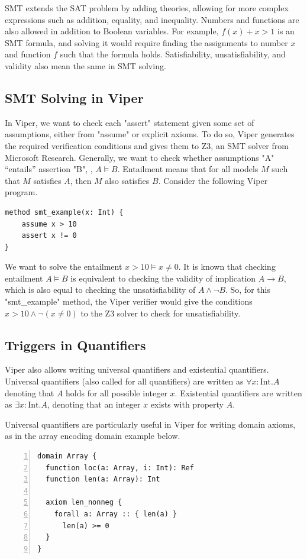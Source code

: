 \documentclass[msc,oneside]{ubcthesis}
\begin{document}
SMT extends the SAT problem by adding theories, allowing for more complex expressions such as addition, equality, and inequality. Numbers and functions are also allowed in addition to Boolean variables. For example, $f(x) + x > 1$ is an SMT formula, and solving it would require finding the assignments to number $x$ and function $f$ such that the formula holds. Satisfiability, unsatisfiability, and validity also mean the same in SMT solving.

\subsection{SMT Solving in Viper}
In Viper, we want to check each "assert" statement given some set of assumptions, either from "assume" or explicit axioms. To do so, Viper generates the required verification conditions and gives them to Z3, an SMT solver from Microsoft Research. Generally, we want to check whether assumptions "A" ``entails'' assertion "B", \ie, $A \models B$. Entailment means that for all models $M$ such that $M$ satisfies $A$, then $M$ also satisfies $B$. Consider the following Viper program.
\begin{lstlisting}
method smt_example(x: Int) {
    assume x > 10
    assert x != 0
}
\end{lstlisting}
We want to solve the entailment $x > 10 \models x \neq 0$. It is known that checking entailment $A \models B$ is equivalent to checking the validity of implication $A \rightarrow B$, which is also equal to checking the unsatisfiability of  $A \land \neg B$. So, for this "smt_example" method, the Viper verifier would give the conditions $x > 10\land \neg( x \neq 0)$ to the Z3 solver to check for unsatisfiability. 

\subsection{Triggers in Quantifiers}
Viper also allows writing universal quantifiers and existential quantifiers. Universal quantifiers (also called for all quantifiers) are written as $\forall x: \text{Int}. A$ denoting that $A$ holds for all possible integer $x$. Existential quantifiers are written as $\exists x: \text{Int}. A$, denoting that an integer $x$ exists with property $A$.

Universal quantifiers are particularly useful in Viper for writing domain axioms, as in the array encoding domain example below.
\begin{lstlisting}[language=silver,numbers=left, firstnumber=1, stepnumber=1]
domain Array {
  function loc(a: Array, i: Int): Ref
  function len(a: Array): Int

  axiom len_nonneg {
    forall a: Array :: { len(a) }
      len(a) >= 0
  }
}
\end{lstlisting}
\end{document}
